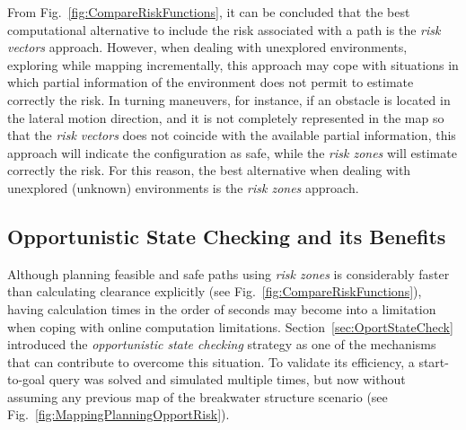 From Fig.~\ref{fig:CompareRiskFunctions}, it can be concluded that the best
computational alternative to include the risk associated with a path is the
\textit{risk vectors} approach. However, when dealing with unexplored
environments, \ie exploring while mapping incrementally, this approach may cope
with situations in which partial information of the environment does not permit
to estimate correctly the risk. In turning maneuvers, for instance, if an
obstacle is located in the lateral motion direction, and it is not completely
represented in the map so that the \textit{risk vectors} does not coincide with
the available partial information, this approach will indicate the configuration
as safe, while the \textit{risk zones} will estimate correctly the risk. For
this reason, the best alternative when dealing with unexplored (unknown)
environments is the \textit{risk zones} approach.

\subsection{Opportunistic State Checking and its Benefits}

Although planning feasible and safe paths using \textit{risk zones} is
considerably faster than calculating clearance explicitly (see
Fig.~\ref{fig:CompareRiskFunctions}), having calculation times in the order of
seconds may become into a limitation when coping with online computation
limitations. Section~\ref{sec:OportStateCheck} introduced the
\textit{opportunistic state checking} strategy as one of the mechanisms that can
contribute to overcome this situation. To validate its efficiency, a
start-to-goal query was solved and simulated multiple times, but now without
assuming any previous map of the breakwater structure scenario (see
Fig.~\ref{fig:MappingPlanningOpportRisk}).

